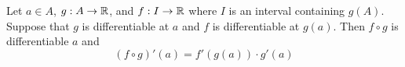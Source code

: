 \documentclass[../main.tex]{subfiles}
\begin{document}
\begin{theorem}\label{trm:12.10}
    Let $a\in A$, $g:A\to\mathbb{R}$, and $f:I\to\mathbb{R}$ where $I$ is an interval containing $g(A)$. Suppose that $g$ is differentiable at $a$ and $f$ is differentiable at $g(a)$. Then $f\circ g$ is differentiable $a$ and
    \begin{equation*}
        (f\circ g)'(a) = f'(g(a))\cdot g'(a)
    \end{equation*}

            

            

\end{theorem}
\end{document}

